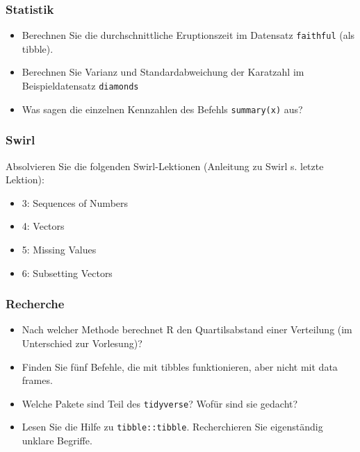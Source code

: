 \documentclass[11pt,german,a4paper]{article}
\providecommand{\tightlist}{%
  \setlength{\itemsep}{0pt}\setlength{\parskip}{0pt}}
\begin{document}
\hypertarget{statistik}{%
\subsubsection{Statistik}\label{statistik}}

\begin{itemize}
\tightlist
\item
  Berechnen Sie die durchschnittliche Eruptionszeit im Datensatz \texttt{faithful} (als tibble).
\item
  Berechnen Sie Varianz und Standardabweichung der Karatzahl im Beispieldatensatz \texttt{diamonds}
\item
  Was sagen die einzelnen Kennzahlen des Befehls \texttt{summary(x)} aus?
\end{itemize}

\hypertarget{swirl-1}{%
\subsubsection{Swirl}\label{swirl-1}}

Absolvieren Sie die folgenden Swirl-Lektionen (Anleitung zu Swirl s. letzte Lektion):

\begin{itemize}
\tightlist
\item
  3: Sequences of Numbers
\item
  4: Vectors
\item
  5: Missing Values
\item
  6: Subsetting Vectors
\end{itemize}

\hypertarget{recherche-1}{%
\subsubsection{Recherche}\label{recherche-1}}

\begin{itemize}
\tightlist
\item
  Nach welcher Methode berechnet R den Quartilsabstand einer Verteilung (im Unterschied zur Vorlesung)?
\item
  Finden Sie fünf Befehle, die mit tibbles funktionieren, aber nicht mit data frames.
\item
  Welche Pakete sind Teil des \texttt{tidyverse}? Wofür sind sie gedacht?
\item
  Lesen Sie die Hilfe zu \texttt{tibble::tibble}. Recherchieren Sie eigenständig unklare Begriffe.
\end{itemize}
\end{document}
